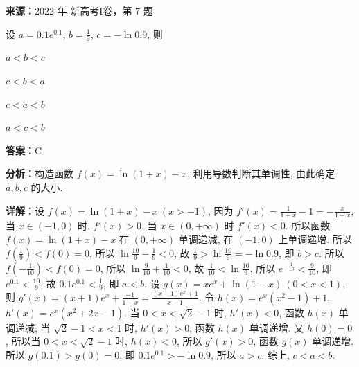 \begin{question}[points=5]
\textbf{来源：}2022 年 新高考I卷，第 7 题\par
设 $a = 0.1e^{0.1}$, $b = \frac{1}{9}$, $c = -\ln 0.9$, 则
\begin{choices}
  \item $a < b < c$
  \item $c < b < a$
  \item $c < a < b$
  \item $a < c < b$
\end{choices}
\begin{solution}
\textbf{答案：}C

\textbf{分析：}构造函数 $f(x) = \ln(1+x) - x$, 利用导数判断其单调性, 由此确定 $a, b, c$ 的大小.

\textbf{详解：}设 $f(x) = \ln(1+x) - x\ (x > -1)$, 因为 $f'(x) = \frac{1}{1+x} - 1 = -\frac{x}{1+x}$, 当 $x \in (-1, 0)$ 时, $f'(x) > 0$, 当 $x \in (0, +\infty)$ 时 $f'(x) < 0$. 所以函数 $f(x) = \ln(1+x) - x$ 在 $(0, +\infty)$ 单调递减, 在 $(-1, 0)$ 上单调递增. 所以 $f(\frac{1}{9}) < f(0) = 0$, 所以 $\ln\frac{10}{9} - \frac{1}{9} < 0$, 故 $\frac{1}{9} > \ln\frac{10}{9} = -\ln 0.9$, 即 $b > c$. 所以 $f(-\frac{1}{10}) < f(0) = 0$, 所以 $\ln\frac{9}{10} + \frac{1}{10} < 0$, 故 $\frac{1}{10} < \ln\frac{10}{9}$, 所以 $e^{-\frac{1}{10}} < \frac{9}{10}$, 即 $e^{0.1} < \frac{10}{9}$, 故 $0.1e^{0.1} < \frac{1}{9}$, 即 $a < b$. 设 $g(x) = xe^x + \ln(1-x)\ (0 < x < 1)$, 则 $g'(x) = (x+1)e^x + \frac{-1}{1-x} = \frac{(x-1)e^x + 1}{x-1}$. 令 $h(x) = e^x(x^2-1)+1$, $h'(x) = e^x(x^2+2x-1)$. 当 $0 < x < \sqrt{2}-1$ 时, $h'(x) < 0$, 函数 $h(x)$ 单调递减; 当 $\sqrt{2}-1 < x < 1$ 时, $h'(x) > 0$, 函数 $h(x)$ 单调递增. 又 $h(0)=0$, 所以当 $0 < x < \sqrt{2}-1$ 时, $h(x) < 0$, 所以 $g'(x) > 0$, 函数 $g(x)$ 单调递增. 所以 $g(0.1) > g(0)=0$, 即 $0.1e^{0.1} > -\ln 0.9$, 所以 $a > c$. 综上, $c < a < b$.
\end{solution}
\end{question}

